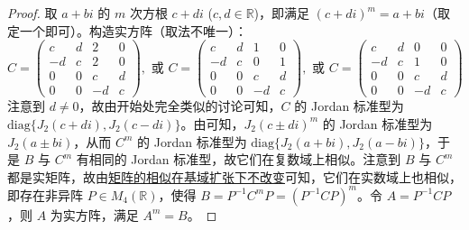 \documentclass[../../main.tex]{subfiles}
\begin{document}
\begin{proof}
取 $a + bi$ 的 $m$ 次方根 $c + di$ ($c,d\in\mathbb{R}$)，即满足 $(c + di)^m = a + bi$（取定一个即可）。构造实方阵（取法不唯一）：
\[
C = 
\begin{pmatrix}
c & d & 2 & 0 \\
-d & c & 2 & 0 \\
0 & 0 & c & d \\
0 & 0 & -d & c
\end{pmatrix}, \text{ 或 }
C = 
\begin{pmatrix}
c & d & 1 & 0 \\
-d & c & 0 & 1 \\
0 & 0 & c & d \\
0 & 0 & -d & c
\end{pmatrix}, \text{ 或 }
C = 
\begin{pmatrix}
c & d & 0 & 0 \\
-d & c & 1 & 0 \\
0 & 0 & c & d \\
0 & 0 & -d & c
\end{pmatrix}
\]
注意到 $d\neq 0$，故由开始处完全类似的讨论可知，$C$ 的 Jordan 标准型为 $\mathrm{diag}\{J_2(c + di),J_2(c - di)\}$。由可知，$J_2(c\pm di)^m$ 的 Jordan 标准型为 $J_2(a\pm bi)$，从而 $C^m$ 的 Jordan 标准型为 $\mathrm{diag}\{J_2(a + bi),J_2(a - bi)\}$，于是 $B$ 与 $C^m$ 有相同的 Jordan 标准型，故它们在复数域上相似。注意到 $B$ 与 $C^m$ 都是实矩阵，故由\hyperref[corollary:矩阵的相似关系在基域扩张下不变]{矩阵的相似在基域扩张下不改变}可知，它们在实数域上也相似，即存在非异阵 $P\in M_4(\mathbb{R})$，使得 $B = P^{-1}C^mP = (P^{-1}CP)^m$。令 $A = P^{-1}CP$，则 $A$ 为实方阵，满足 $A^m = B$。

\end{proof}
\end{document}
